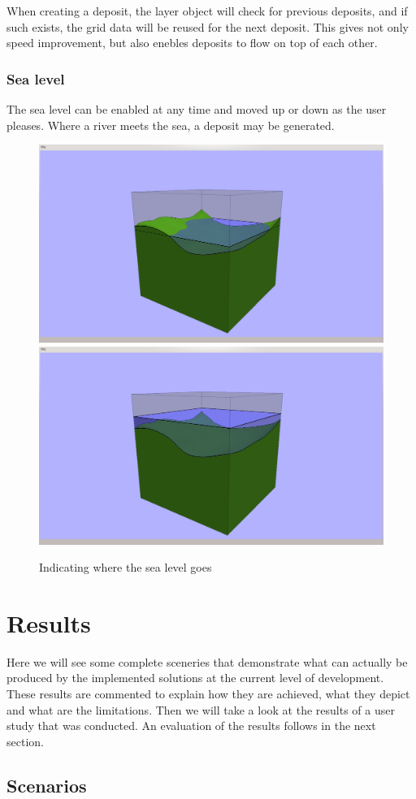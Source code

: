 \documentclass[a4paper,12pt]{report}
\begin{document}
When creating a deposit, the layer object will check for previous deposits, and if such exists, the grid data will be reused for the next deposit. This gives not only speed improvement, but also enebles deposits to flow on top of each other.

\subsection{Sea level}
The sea level can be enabled at any time and moved up or down as the user pleases. Where a river meets the sea, a deposit may be generated.

\begin{figure}
\includegraphics[trim = 90mm 7mm 80mm 30mm, clip,width=.5\linewidth]{thesis/results/seaEnabled.png}
\includegraphics[trim = 90mm 7mm 80mm 30mm, clip,width=.5\linewidth]{thesis/results/seaChanged.png}
 \caption{Indicating where the sea level goes}
 \label{fig:seaLevel}
\end{figure}


\clearpage
\chapter{Results}
Here we will see some complete sceneries that demonstrate what can actually be produced by the implemented solutions at the current level of development. These results are commented to explain how they are achieved, what they depict and what are the limitations. Then we will take a look at the results of a user study that was conducted. An evaluation of the results follows in the next section.
\label{sec:results}

\section{Scenarios}
\end{document}
